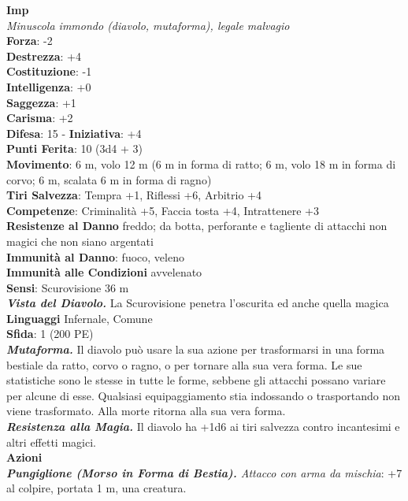 \begin{multicols}{2}
\medskip\textbf{Imp}\\
\emph{Minuscola immondo (diavolo, mutaforma), legale malvagio}\\
\textbf{Forza}: -2\\
\textbf{Destrezza}: +4\\
\textbf{Costituzione}: -1\\
\textbf{Intelligenza}: +0\\
\textbf{Saggezza}: +1\\
\textbf{Carisma}: +2\\
\textbf{Difesa}: 15 - \textbf{Iniziativa}: +4\\
\textbf{Punti Ferita}: 10 (3d4 + 3)\\
\textbf{Movimento}: 6 m, volo 12 m (6 m in forma di ratto; 6 m, volo 18 m in forma di corvo; 6 m, scalata 6 m in forma di ragno)\\
\textbf{Tiri Salvezza}: Tempra +1, Riflessi +6, Arbitrio +4\\
\textbf{Competenze}: Criminalità +5, Faccia tosta +4, Intrattenere +3\\
\textbf{Resistenze al Danno} freddo; da botta, perforante e tagliente di attacchi non magici che non siano argentati\\
\textbf{Immunità al Danno}: fuoco, veleno\\
\textbf{Immunità alle Condizioni} avvelenato\\
\textbf{Sensi}: Scurovisione 36 m\\
\emph{\textbf{Vista del Diavolo.}} La Scurovisione penetra l'oscurita ed anche quella magica\\
\textbf{Linguaggi} Infernale, Comune\\
\textbf{Sfida}: 1 (200 PE)\smallskip\\
\emph{\textbf{Mutaforma.}} Il diavolo può usare la sua azione per trasformarsi in una forma bestiale da ratto, corvo o ragno, o per tornare alla sua vera forma. Le sue statistiche sono le stesse in tutte le forme, sebbene gli attacchi possano variare per alcune di esse. Qualsiasi equipaggiamento stia indossando o trasportando non viene trasformato. Alla morte ritorna alla sua vera forma. \\
\emph{\textbf{Resistenza alla Magia.}} Il diavolo ha +1d6 ai tiri salvezza contro incantesimi e altri effetti magici.\\
\smallskip\textbf{Azioni}\\
\emph{\textbf{Pungiglione (Morso in Forma di Bestia).} Attacco con arma da mischia}: +7 al colpire, portata 1 m, una creatura.\\

\end{multicols}
